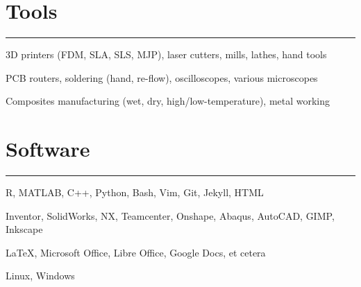 \section{Tools}
\noindent\rule{\textwidth}{\hlinewidth}
    \begin{innerlist}
    \item 3D printers (FDM, SLA, SLS, MJP), laser cutters, mills, lathes, hand tools
    \item PCB routers, soldering (hand, re-flow), oscilloscopes, various microscopes
    \item Composites manufacturing (wet, dry, high/low-temperature), metal working
    \end{innerlist}

\vfill
\section{Software}
\noindent\rule{\textwidth}{\hlinewidth}
    \begin{innerlist}
        \item R, MATLAB, C++, Python, Bash, Vim, Git, Jekyll, HTML
        \item Inventor, SolidWorks, NX, Teamcenter, Onshape, Abaqus, AutoCAD, GIMP, Inkscape
        \item \LaTeX, Microsoft Office, Libre Office, Google Docs, et cetera
        \item Linux, Windows
    \end{innerlist}

\vfill
